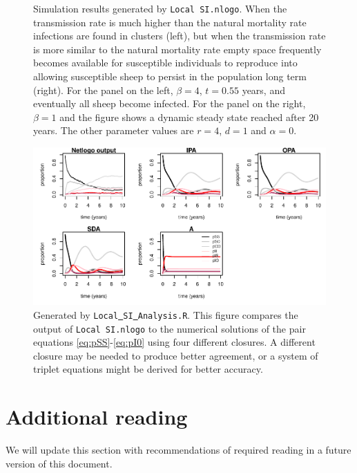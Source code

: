 \documentclass[11pt, oneside]{article}   	%
\begin{document}
\begin{figure}
\begin{minipage}{.5\textwidth}
\end{minipage}
\vspace{-2cm}
\caption[]{Simulation results generated by \texttt{Local SI.nlogo}. When the transmission rate is much higher than the natural mortality rate infections are found in clusters (left), but when the transmission rate is more similar to the natural mortality rate empty space frequently becomes available for susceptible individuals to reproduce into allowing susceptible sheep to persist in the population long term (right). For the panel on the left, $\beta = 4$, $t = 0.55$ years, and eventually all sheep become infected. For the panel on the right, $\beta = 1$ and the figure shows a dynamic steady state reached after 20 years. The other parameter values are $r=4$, $d=1$ and $\alpha=0$.}\label{fig:netlogobeta} 
\end{figure}

\begin{figure}
\includegraphics[width=\textwidth]{closure_comp}
\caption[]{Generated by \texttt{Local\underline{ }SI\underline{ }Analysis.R}. This figure compares the output of  \texttt{Local SI.nlogo} to the numerical solutions of the pair equations \ref{eq:pSS}-\ref{eq:pI0} using four different closures. A different closure may be needed to produce better agreement, or a system of triplet equations might be derived for better accuracy.}\label{fig:closure} 
\end{figure}
\FloatBarrier
\section{Additional reading}\label{sec:AR}

We will update this section with recommendations of required reading in a future version of this document.

\makeatletter
\renewcommand\@biblabel[1]{}
\makeatother
\end{document}
